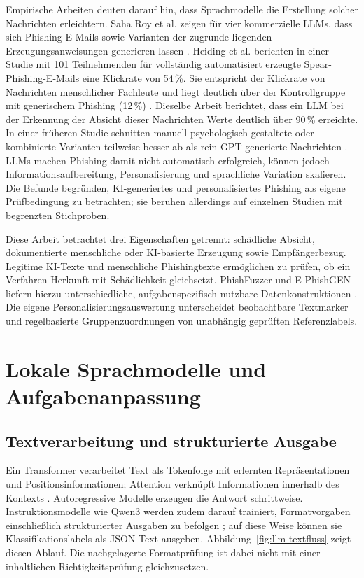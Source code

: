 \documentclass[12pt,twoside=false,a4paper,parskip]{scrbook}
\begin{document}
Empirische Arbeiten deuten darauf hin, dass Sprachmodelle die Erstellung solcher Nachrichten erleichtern. Saha Roy et al. zeigen für vier kommerzielle LLMs, dass sich Phishing-E-Mails sowie Varianten der zugrunde liegenden Erzeugungsanweisungen generieren lassen \cite{roy2024phishbots}. Heiding et al. berichten in einer Studie mit 101 Teilnehmenden für vollständig automatisiert erzeugte Spear-Phishing-E-Mails eine Klickrate von 54\,\%. Sie entspricht der Klickrate von Nachrichten menschlicher Fachleute und liegt deutlich über der Kontrollgruppe mit generischem Phishing (12\,\%) \cite{heiding2024automated}. Dieselbe Arbeit berichtet, dass ein LLM bei der Erkennung der Absicht dieser Nachrichten Werte deutlich über 90\,\% erreichte. In einer früheren Studie schnitten manuell psychologisch gestaltete oder kombinierte Varianten teilweise besser ab als rein GPT-generierte Nachrichten \cite{heiding2024devising}. LLMs machen Phishing damit nicht automatisch erfolgreich, können jedoch Informationsaufbereitung, Personalisierung und sprachliche Variation skalieren. Die Befunde begründen, KI-generiertes und personalisiertes Phishing als eigene Prüfbedingung zu betrachten; sie beruhen allerdings auf einzelnen Studien mit begrenzten Stichproben.

Diese Arbeit betrachtet drei Eigenschaften getrennt: schädliche Absicht, dokumentierte menschliche oder KI-basierte Erzeugung sowie Empfängerbezug. Legitime KI-Texte und menschliche Phishingtexte ermöglichen zu prüfen, ob ein Verfahren Herkunft mit Schädlichkeit gleichsetzt. PhishFuzzer und E-PhishGEN liefern hierzu unterschiedliche, aufgabenspezifisch nutzbare Datenkonstruktionen \cite{toth2025phishfuzzer,pajola2025ephishgen}. Die eigene Personalisierungsauswertung unterscheidet beobachtbare Textmarker und regelbasierte Gruppenzuordnungen von unabhängig geprüften Referenzlabels.

\section{Lokale Sprachmodelle und Aufgabenanpassung}\label{sec:llm}

\subsection{Textverarbeitung und strukturierte Ausgabe}\label{sec:tokenverarbeitung}

Ein Transformer verarbeitet Text als Tokenfolge mit erlernten Repräsentationen und Positionsinformationen; Attention verknüpft Informationen innerhalb des Kontexts \cite{vaswani2017attention}. Autoregressive Modelle erzeugen die Antwort schrittweise. Instruktionsmodelle wie Qwen3 werden zudem darauf trainiert, Formatvorgaben einschließlich strukturierter Ausgaben zu befolgen \cite{qwen2025technical}; auf diese Weise können sie Klassifikationslabels als JSON-Text ausgeben. Abbildung~\ref{fig:llm-textfluss} zeigt diesen Ablauf. Die nachgelagerte Formatprüfung ist dabei nicht mit einer inhaltlichen Richtigkeitsprüfung gleichzusetzen.
\end{document}
